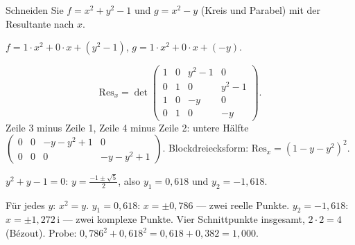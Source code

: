 \begin{aufgabe}
Schneiden Sie $f = x^{2} + y^{2} - 1$ und $g = x^{2} - y$ (Kreis und Parabel) mit der Resultante nach $x$.

\loesung
{}
$f = 1\cdot x^{2} + 0\cdot x + (y^{2} - 1)$, $g = 1\cdot x^{2} + 0\cdot x + (-y)$.

\[ \mathrm{Res}_x = \det\begin{pmatrix}1 & 0 & y^{2} - 1 & 0\\ 0 & 1 & 0 & y^{2} - 1\\ 1 & 0 & -y & 0\\ 0 & 1 & 0 & -y\end{pmatrix} . \]
Zeile 3 minus Zeile 1, Zeile 4 minus Zeile 2: untere Hälfte $\begin{pmatrix}0 & 0 & -y - y^{2} + 1 & 0\\ 0 & 0 & 0 & -y - y^{2} + 1\end{pmatrix}$. Blockdreiecksform: $\mathrm{Res}_x = (1 - y - y^{2})^{2}$.

$y^{2} + y - 1 = 0$: $y = \tfrac{-1\pm\sqrt5}{2}$, also $y_1 = 0{,}618$ und $y_2 = -1{,}618$.

Für jedes $y$: $x^{2} = y$. $y_1 = 0{,}618$: $x = \pm0{,}786$ --- zwei reelle Punkte. $y_2 = -1{,}618$: $x = \pm1{,}272\,\mathrm i$ --- zwei komplexe Punkte. Vier Schnittpunkte insgesamt, $2\cdot2 = 4$ (Bézout). Probe: $0{,}786^{2} + 0{,}618^{2} = 0{,}618 + 0{,}382 = 1{,}000$. \checkmark

\begin{center}
\begin{minipage}{0.88\textwidth}
\end{minipage}
\end{center}
\end{aufgabe}


